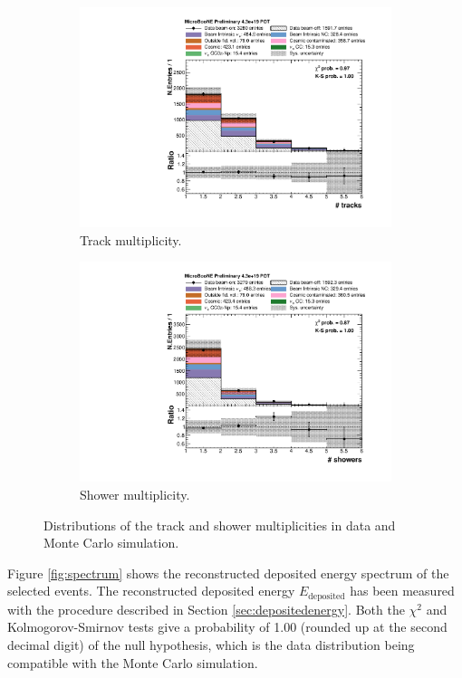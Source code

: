 \begin{figure}[htbp]
\centering
  \begin{subfigure}{0.49\textwidth}
    \includegraphics[width=\linewidth]{figures/n_tracks.pdf}
    \caption{Track multiplicity.} 
  \end{subfigure}\hfill
    \begin{subfigure}{0.49\textwidth}
    \includegraphics[width=\linewidth]{figures/n_showers.pdf}
    \caption{Shower multiplicity.} 
  \end{subfigure}
  \caption{Distributions of the track and shower multiplicities in data and Monte Carlo simulation.}\label{fig:multiplicity}
\end{figure}

Figure \ref{fig:spectrum} shows the reconstructed deposited energy spectrum of the selected events. The reconstructed deposited energy $E_{\mathrm{deposited}}$ has been measured with the procedure described in Section \ref{sec:depositedenergy}. Both the $\chi^2$ and Kolmogorov-Smirnov \cite{massey1951kolmogorov} tests give a probability of 1.00 (rounded up at the second decimal digit) of the null hypothesis, which is the data distribution being compatible with the Monte Carlo simulation.

